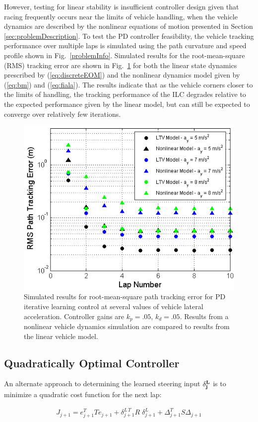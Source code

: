 \documentclass[letterpaper, 10 pt, conference]{ieeeconf}  %
\begin{document}
However, testing for linear stability is insufficient controller design given that racing frequently occurs near the limits of vehicle handling, when the vehicle dynamics are described 
by the nonlinear equations of motion presented in Section \ref{sec:problemDescription}. To test the PD controller feasibility, the vehicle tracking performance over multiple laps is
simulated using the path curvature and speed profile shown in Fig.~\ref{problemInfo}.
Simulated results for the root-mean-square (RMS) tracking error are shown in Fig.~\ref{fig:PDsimResults} for both the linear state dynamics prescribed by (\ref{eq:discreteEOM}) and 
the nonlinear dynamics model given by (\ref{eq:bm})
and (\ref{eq:fiala}). The results indicate that as the vehicle corners closer to the limits of handling, the tracking performance of the ILC degrades relative to the expected performance
given by the linear model, but can still be expected to converge over relatively few iterations. 

\begin{figure}
\centering
\includegraphics[width=3 in]{figures/PDsimResults.png}
\caption{Simulated results for root-mean-square path tracking error for PD iterative learning control at several values of vehicle lateral acceleration. Controller gains are $k_p = .05$, $k_d = .05$. Results from a nonlinear vehicle dynamics simulation are compared to results
from the linear vehicle model. }
\label{fig:PDsimResults}
\end{figure}

\subsection{Quadratically Optimal Controller}\label{sec:controller}

An alternate approach to determining the learned steering input $\bf{\delta}^L_j$ is to minimize a quadratic cost function for the next lap:

\begin{align}
J_{j\!+\!1} = e_{j\!+\!1}^TTe_{j\!+\!1} + \delta^{L\,T}_{j\!+\!1} R \; \delta^L_{j\!+\!1}+\Delta_{j\!+\!1}^TS\Delta_{j\!+\!1}
\label{eq:QILC}
\end{align}
\end{document}
